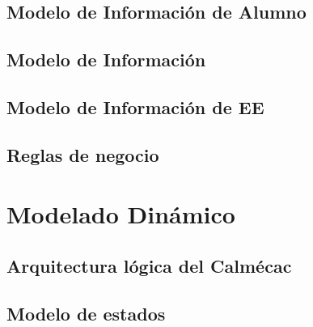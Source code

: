 \documentclass[10pt]{book}
\begin{document}
        \chapter{Modelo de Información de Alumno}
        \label{ch:alumno}
        
        
        \chapter{Modelo de Información}
        \label{ch:informacion}
        
        
        
	    \chapter{Modelo de Información de EE}
	    \label{ch:ee}
	    
	    
	            
        \chapter{Reglas de negocio}
        \label{ch:reglas}
        
        
        \part{Modelado Dinámico}
        \label{ch:modeloDinamico}
        
        \chapter{Arquitectura lógica del Calmécac}
        \label{ch:arquitectura}
        
        
        \chapter{Modelo de estados}
        \label{ch:estados}
        
        
\end{document}
